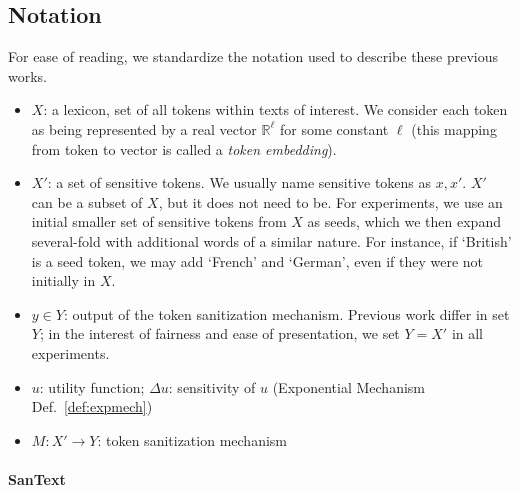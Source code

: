 \documentclass[11pt]{article}
\newcommand{\clusant}{CluSanT\xspace}
\begin{document}
\subsection{Notation}
For ease of reading, we standardize the notation used to describe these previous works. 
\begin{itemize}
\setlength\itemsep{0em}
    \item $X$: a lexicon, set of all tokens within texts of interest. We consider each token as being represented by a real vector $\mathbb{R}^\ell$ for some constant $\ell$ (this mapping from token to vector is called a {\em token embedding}).
    \item $X'$: a set of sensitive tokens. We usually name sensitive tokens as $x, x'$. $X'$ can be a subset of $X$, but it does not need to be. 
    For experiments, we use an initial smaller set of sensitive tokens from $X$ as seeds, which we then expand several-fold with additional words of a similar nature. For instance, if `British' is a seed token, we may add `French' and `German', even if they were not initially in $X$. %
    \item $y\in Y$:  output of the token sanitization mechanism. Previous work differ in set $Y$; in the interest of fairness and ease of presentation, we set $Y = X'$ in all experiments. 
    \item $u$: utility function; $\Delta u$: sensitivity of $u$ 
    (Exponential Mechanism Def.~\ref{def:expmech})
    \item $M:X' \rightarrow Y$: token sanitization mechanism 
\end{itemize}


\paragraph{SanText~\cite{yue2021differential}}
\end{document}
